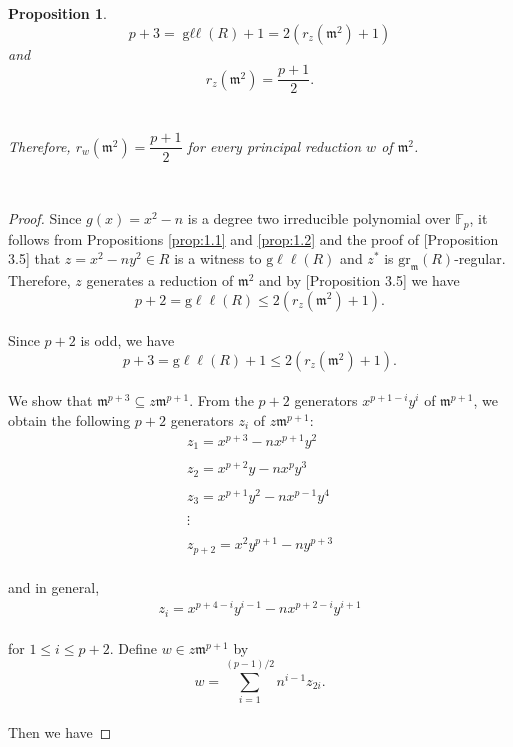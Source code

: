 \documentclass{amsart}
\newtheorem{proposition}[theorem]{Proposition}
\theoremstyle{definition}
\theoremstyle{definition}
\numberwithin{equation}{section}
\theoremstyle{definition}
\DeclareMathOperator{\Gll}{g\ell\ell}
\begin{document}
{\begin{proposition}
\[
p+3=\Gll(R)+1=2\left(r_{z}(\mathfrak{m}^2) + 1 \right)
\] and \text{}\\ 
\[
r_{z}(\mathfrak{m}^2)=\dfrac{p+1}{2}.
\] \text{}\\\\
Therefore, $r_{w}(\mathfrak{m}^2)=\dfrac{p+1}{2}$ for every principal reduction $w$ of $\mathfrak{m}^2$.
\end{proposition} \text{}\\
\begin{proof}
Since $g(x)=x^2-n$ is a degree two irreducible polynomial over $\mathbb{F}_p$, it follows from Propositions \ref{prop:1.1} and \ref{prop:1.2} and the proof of \cite{Bartels24}[Proposition 3.5] that $z=x^2-ny^2 \in R$ is a witness to $\text{g}\ell\ell(R)$ and $z^*$ is $\text{gr}_{\mathfrak{m}}(R)$-regular. Therefore, $z$ generates a reduction of $\mathfrak{m}^2$ and by \cite{Bartels24}[Proposition 3.5] we have \\
\[
p+2=\text{g}\ell\ell(R) \leq 2 \left(r_{z}(\mathfrak{m}^2) + 1 \right).
\]\text{}\\ Since $p+2$ is odd, we have \\
\[
p+3=\text{g}\ell\ell(R) + 1 \leq 2 \left(r_{z}(\mathfrak{m}^2) + 1 \right).
\] \text{}\\ We show that $\mathfrak{m}^{p+3} \subseteq z \mathfrak{m}^{p+1}$. From the $p+2$ generators $x^{p+1-i}y^i$ of $\mathfrak{m}^{p+1}$, we obtain the following $p+2$ generators $z_i$ of $z \mathfrak{m}^{p+1}$: \text{}\\
\begin{align*}
&z_1 = x^{p+3} -nx^{p+1}y^2&\\\\
&z_2 = x^{p+2}y - nx^{p}y^3&\\\\
&z_3 = x^{p+1}y^2 - nx^{p-1}y^4&\\\\
&\vdots& \\\\
&z_{p+2}=x^2 y^{p+1}-ny^{p+3}&
\end{align*} \text{}\\ and in general, 
\begin{align*}
&z_i=x^{p+4-i}y^{i-1} - n x^{p+2-i}y^{i+1}&
\end{align*}\text{}\\ 
for $1 \leq i \leq p+2$. Define $w \in z \mathfrak{m}^{p+1}$ by \\ 
\[
w=\sum\limits_{i=1}^{(p-1)/2} n^{i-1} z_{2i}.
\] \text{}\\ Then we have 

\end{proof}}
\end{document}

